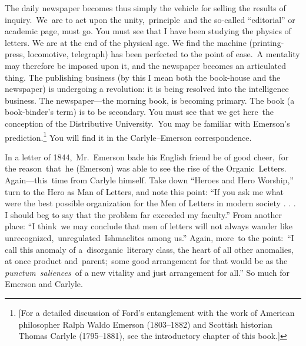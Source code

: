 \documentclass[openany,nobib]{tufte-book}
\begin{document}
The daily newspaper becomes thus simply the vehicle for selling the
results of inquiry.~We~are to act upon the unity,~principle~and the
so-called ``editorial'' or academic page, must go. You must see that I
have been studying the physics of letters. We are at the end of the
physical age. We find the machine (printing-press, locomotive,
telegraph) has been perfected to the point of ease.~A mentality may
therefore be imposed upon it, and the newspaper becomes an articulated
thing. The publishing business (by this I mean both the book-house and
the newspaper) is undergoing a revolution: it is being resolved into the
intelligence business. The newspaper---the morning book, is becoming
primary. The book (a book-binder's term) is to be secondary. You must
see that we get here~the conception of the Distributive University.~You
may be familiar with Emerson's prediction.\footnote{{[}For a detailed
  discussion of Ford's entanglement with the work of American
  philosopher Ralph Waldo Emerson (1803--1882) and Scottish historian
  Thomas Carlyle (1795--1881), see the introductory chapter of this
  book.{]}} You will find it in the Carlyle--Emerson correspondence.~

In a letter of 1844,~Mr.~Emerson bade his English friend be of good
cheer,~for the reason~that~he (Emerson) was able to see the rise of the
Organic~Letters. Again---this~time from Carlyle himself. Take down
``Heroes and Hero Worship,'' turn to the Hero as Man of Letters, and
note this point: ``If you ask me what were the best possible
organization for the Men of Letters in modern society . . . I should beg
to say that the problem far exceeded my faculty.'' From another place:
``I think~we may conclude that men of letters will not always wander
like unrecognized,~unregulated~Ishmaelites among us.'' Again, more~to
the point:~``I call this anomaly of a~disorganic~literary class, the
heart of all other anomalies, at once product and~parent;~some good
arrangement for that would be as the \emph{punctum~saliences}~of a new
vitality and just arrangement for all.'' So much for Emerson and
Carlyle.~
\end{document}
